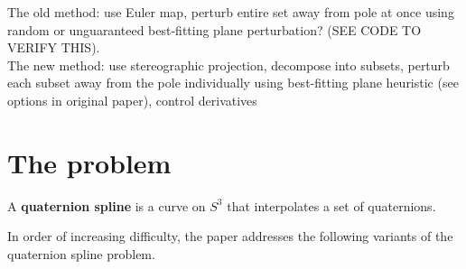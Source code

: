 \documentclass[12pt]{article}
\begin{document}
The old method: use Euler map, perturb entire set away from pole at once 
                using random or unguaranteed best-fitting plane perturbation? 
		(SEE CODE TO VERIFY THIS).\\
The new method: use stereographic projection, decompose into subsets, perturb each subset
                away from the pole individually using best-fitting plane heuristic 
		(see options in original paper),
		control derivatives

\section{The problem}

\begin{defn2}
A {\bf quaternion spline} is a curve on $S^3$ that interpolates a set of quaternions.
\end{defn2}

\noindent In order of increasing difficulty,
the paper addresses the following variants of the quaternion spline problem.
\end{document}

